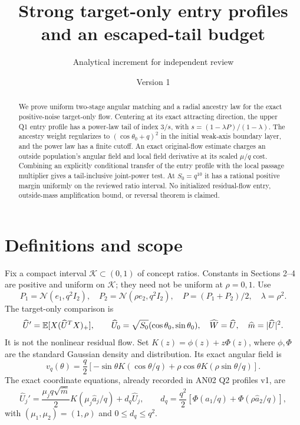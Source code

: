 \documentclass[11pt]{article}
\title{Strong target-only entry profiles and an escaped-tail budget}
\author{Analytical increment for independent review}\date{Version 1}
\numberwithin{equation}{section}
\theoremstyle{remark}\newtheorem{remark}[theorem]{Remark}
\begin{document}
\maketitle
\begin{abstract}
We prove uniform two-stage angular matching and a radial ancestry law for the exact positive-noise target-only flow. Centering at its exact attracting direction, the upper Q1 entry profile has a power-law tail of index $3/s$, with $s=(1-\lambda P)/(1-\lambda)$. The ancestry weight regularizes to $(\cos\theta_0+q)^2$ in the initial weak-axis boundary layer, and the power law has a finite cutoff. An exact original-flow estimate charges an outside population's angular field and local field derivative at its scaled $\mu/q$ cost. Combining an explicitly conditional transfer of the entry profile with the local passage multiplier gives a tail-inclusive joint-power test. At $S_0=q^{10}$ it has a rational positive margin uniformly on the reviewed ratio interval. No initialized residual-flow entry, outside-mass amplification bound, or reversal theorem is claimed.
\end{abstract}

\section{Definitions and scope}\label{inc:AN02:profile:v1:scope}
Fix a compact interval $\mathcal K\subset(0,1)$ of concept ratios. Constants in Sections 2--4 are positive and uniform on $\mathcal K$; they need not be uniform at $\rho=0,1$. Use
\[
 P_1=\mathcal N(e_1,q^2I_2),\quad P_2=\mathcal N(\rho e_2,q^2I_2),\quad P=(P_1+P_2)/2,\quad\lambda=\rho^2.
\]
The target-only comparison is
\[
 \widehat U'=\mathbb E[X(\widehat U^TX)_+],\qquad
 \widehat U_0=\sqrt{S_0}(\cos\theta_0,\sin\theta_0),\quad
 \widehat W=\widehat U,\quad \widehat m=|\widehat U|^2.
\]
It is not the nonlinear residual flow. Set $K(z)=\phi(z)+z\Phi(z)$, where $\phi,\Phi$ are the standard Gaussian density and distribution. Its exact angular field is
\begin{equation}\label{inc:AN02:profile:v1:angle}
 v_q(\theta)=\frac q2[-\sin\theta K(\cos\theta/q)+\rho\cos\theta K(\rho\sin\theta/q)].
\end{equation}
The exact coordinate equations, already recorded in AN02 Q2 profiles v1, are
\begin{equation}\label{inc:AN02:profile:v1:coordinate}
 \widehat U_j'=\frac{\mu_jq\sqrt{\widehat m}}2K(\mu_j\widehat a_j/q)+d_q\widehat U_j,
 \qquad d_q=\frac{q^2}{2}[\Phi(\widehat a_1/q)+\Phi(\rho\widehat a_2/q)],
\end{equation}
with $(\mu_1,\mu_2)=(1,\rho)$ and $0\le d_q\le q^2$.
\end{document}
